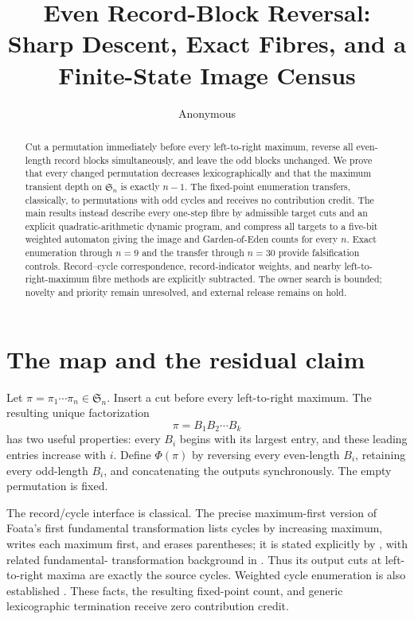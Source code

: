 \documentclass[10pt,a4paper]{amsart}
\title[Even record-block reversal]{Even Record-Block Reversal:\\Sharp Descent, Exact Fibres, and a Finite-State Image Census}
\author{Anonymous}
\date{}
\theoremstyle{definition}
\theoremstyle{remark}
\newcommand{\Sn}{\mathfrak S}
\begin{document}
\begin{abstract}
Cut a permutation immediately before every left-to-right maximum, reverse
all even-length record blocks simultaneously, and leave the odd blocks
unchanged.  We prove that every changed permutation decreases
lexicographically and that the maximum transient depth on \(\Sn_n\) is
exactly \(n-1\).  The fixed-point enumeration transfers, classically, to
permutations with odd cycles and receives no contribution credit.  The main
results instead describe every one-step fibre by admissible target cuts and
an explicit quadratic-arithmetic dynamic program, and compress all targets
to a five-bit weighted automaton giving the image and Garden-of-Eden counts
for every \(n\).  Exact enumeration through \(n=9\) and the transfer through
\(n=30\) provide falsification controls.  Record--cycle correspondence,
record-indicator weights, and nearby left-to-right-maximum fibre methods are
explicitly subtracted.  The owner search is bounded; novelty and priority
remain unresolved, and external release remains on hold.
\end{abstract}

\maketitle

\section{The map and the residual claim}

Let \(\pi=\pi_1\cdots\pi_n\in\Sn_n\).  Insert a cut before every
left-to-right maximum.  The resulting unique factorization
\[
                         \pi=B_1B_2\cdots B_k                 \tag{1.1}
\]
has two useful properties: every \(B_i\) begins with its largest entry, and
these leading entries increase with \(i\).  Define \(\Phi(\pi)\) by
reversing every even-length \(B_i\), retaining every odd-length \(B_i\), and
concatenating the outputs synchronously.  The empty permutation is fixed.

The record/cycle interface is classical.  The precise maximum-first version
of Foata's first fundamental transformation lists cycles by increasing
maximum, writes each maximum first, and erases parentheses; it is stated
explicitly by \citet[p.~40]{RemmelWachs2004}, with related fundamental-
transformation background in \citet{FoataHan2007}.  Thus its output cuts at
left-to-right maxima are exactly the source cycles.  Weighted cycle
enumeration is also established \cite{Lugo2009}.  These facts, the resulting
fixed-point count, and generic lexicographic termination receive zero
contribution credit.
\end{document}
